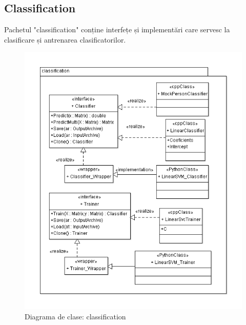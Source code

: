 \subsection{Classification}
Pachetul "classification" conține interfețe și implementări care servesc la clasificare și antrenarea clasificatorilor.
\begin{figure}[h]
	\centering
	\includegraphics[width=1.00\textwidth]{uml/classificationClassDiagram.png}
	\caption{Diagrama de clase: classification}
	\label{fig:classificationClassDiagram}
\end{figure}

